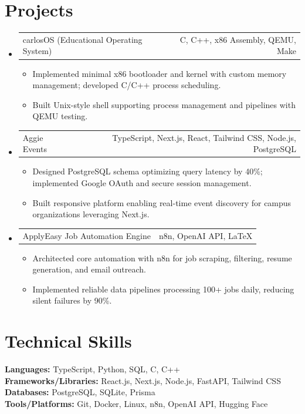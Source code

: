 \documentclass[letterpaper,11pt]{article}
\makeatletter
\newcommand{\resumeItem}[1]{\item\small{{#1 \vspace{-2pt}}}}
\newcommand{\resumeProjectHeading}[2]{
    \item
    \begin{tabular*}{0.97\textwidth}{l@{\extracolsep{\fill}}r}
      \small#1 & #2 \\
    \end{tabular*}\vspace{-7pt}
}
\newcommand{\resumeSubHeadingListStart}{\begin{itemize}[leftmargin=0.15in, label={}]}
\newcommand{\resumeSubHeadingListEnd}{\end{itemize}}
\newcommand{\resumeItemListStart}{\begin{itemize}}
\newcommand{\resumeItemListEnd}{\end{itemize}\vspace{-5pt}}
\makeatother
\begin{document}
\section{Projects}
\resumeSubHeadingListStart

\resumeProjectHeading
{carlosOS (Educational Operating System)}{C, C++, x86 Assembly, QEMU, Make}
\resumeItemListStart
\resumeItem{Implemented minimal x86 bootloader and kernel with custom memory management; developed C/C++ process scheduling.}
\resumeItem{Built Unix-style shell supporting process management and pipelines with QEMU testing.}
\resumeItemListEnd

\resumeProjectHeading
{Aggie Events}{TypeScript, Next.js, React, Tailwind CSS, Node.js, PostgreSQL}
\resumeItemListStart
\resumeItem{Designed PostgreSQL schema optimizing query latency by 40\%; implemented Google OAuth and secure session management.}
\resumeItem{Built responsive platform enabling real-time event discovery for campus organizations leveraging Next.js.}
\resumeItemListEnd

\resumeProjectHeading
{ApplyEasy Job Automation Engine}{n8n, OpenAI API, LaTeX}
\resumeItemListStart
\resumeItem{Architected core automation with n8n for job scraping, filtering, resume generation, and email outreach.}
\resumeItem{Implemented reliable data pipelines processing 100+ jobs daily, reducing silent failures by 90\%.}
\resumeItemListEnd

\resumeSubHeadingListEnd

\section{Technical Skills}
\begin{itemize}[leftmargin=0.15in, label={}]
  \small{\item{
    \textbf{Languages:} TypeScript, Python, SQL, C, C++ \\
    \textbf{Frameworks/Libraries:} React.js, Next.js, Node.js, FastAPI, Tailwind CSS \\
    \textbf{Databases:} PostgreSQL, SQLite, Prisma \\
    \textbf{Tools/Platforms:} Git, Docker, Linux, n8n, OpenAI API, Hugging Face
  }}
\end{itemize}
\end{document}
